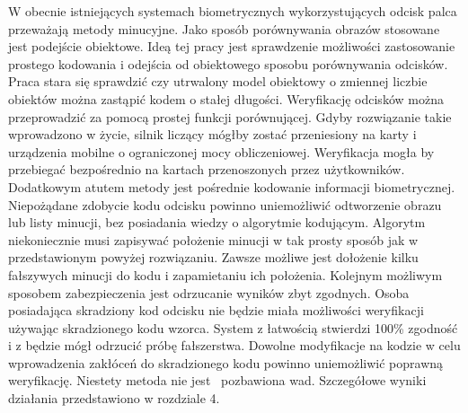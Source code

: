 W obecnie istniejących systemach biometrycznych wykorzystujących odcisk palca przeważają metody minucyjne. Jako sposób porównywania obrazów stosowane jest podejście obiektowe. Ideą tej pracy jest 
sprawdzenie możliwości zastosowanie prostego kodowania i odejścia od obiektowego sposobu porównywania odcisków. Praca stara się sprawdzić czy utrwalony model obiektowy o zmiennej liczbie obiektów można 
zastąpić kodem o stałej długości. Weryfikację odcisków można przeprowadzić za pomocą prostej funkcji porównującej. Gdyby rozwiązanie takie wprowadzono w życie, silnik liczący mógłby zostać przeniesiony na 
karty i urządzenia mobilne o ograniczonej mocy obliczeniowej. Weryfikacja mogła by przebiegać bezpośrednio na kartach przenoszonych przez użytkowników. Dodatkowym atutem metody jest pośrednie kodowanie 
informacji biometrycznej. Niepożądane zdobycie kodu odcisku powinno uniemożliwić odtworzenie obrazu lub listy minucji, bez posiadania wiedzy o algorytmie kodującym. Algorytm niekoniecznie musi zapisywać 
położenie minucji w tak prosty sposób jak w przedstawionym powyżej rozwiązaniu. Zawsze możliwe jest dołożenie kilku fałszywych minucji do kodu i zapamietaniu ich położenia. Kolejnym możliwym sposobem 
zabezpieczenia jest odrzucanie wyników zbyt zgodnych. Osoba posiadająca skradziony kod odcisku nie będzie miała możliwości weryfikacji używając skradzionego kodu wzorca. System z łatwością stwierdzi 100\% 
zgodność i z będzie mógł odrzucić próbę fałszerstwa. Dowolne modyfikacje na kodzie w celu wprowadzenia zakłóceń do skradzionego kodu powinno uniemożliwić poprawną weryfikację. Niestety metoda nie jest \
pozbawiona wad. Szczegółowe wyniki działania przedstawiono w rozdziale 4.

